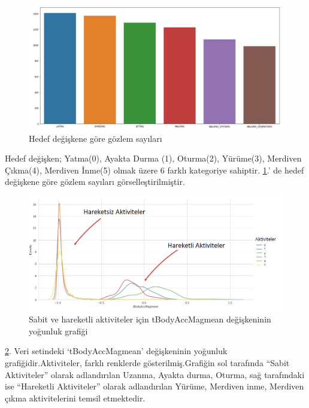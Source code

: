 \documentclass[12pt,twoside]{deuthesis}
\begin{document}
\begin{figure}

{\centering \includegraphics[width=1\linewidth,height=0.45\textheight]{figure/sınıf dağılımı} 

}

\caption{Hedef değişkene göre gözlem sayıları}\label{fig:freq}
\end{figure}
Hedef değişken; Yatma(0), Ayakta Durma (1), Oturma(2), Yürüme(3), Merdiven Çıkma(4), Merdiven İnme(5) olmak üzere 6 farklı kategoriye sahiptir. \ref{fig:freq}.' de hedef değişkene göre gözlem sayıları görselleştirilmiştir.
\begin{figure}
\includegraphics[width=1\linewidth,height=0.45\textheight]{figure/tbodyaccmagplot2} \caption{Sabit ve hareketli aktiviteler için tBodyAccMagmean değişkeninin yoğunluk grafiği}\label{fig:tbodyaccmagplot}
\end{figure}
\ref{fig:tbodyaccmagplot}. Veri setindeki `tBodyAccMagmean' değişkeninin yoğunluk grafiğidir.Aktiviteler, farklı renklerde gösterilmiş.Grafiğin sol tarafında ``Sabit Aktiviteler'' olarak adlandırılan Uzanma, Ayakta durma, Oturma, sağ tarafındaki ise ``Hareketli Aktiviteler'' olarak adlandırılan Yürüme, Merdiven inme, Merdiven çıkma aktivitelerini temsil etmektedir.
\end{document}
